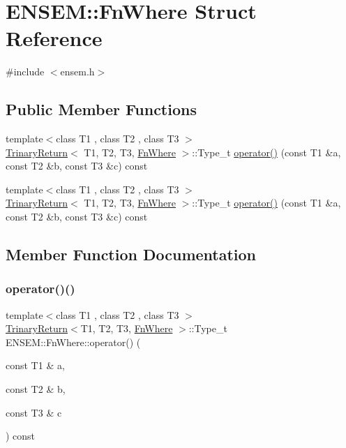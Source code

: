 \hypertarget{structENSEM_1_1FnWhere}{}\section{E\+N\+S\+EM\+:\+:Fn\+Where Struct Reference}
\label{structENSEM_1_1FnWhere}


{\ttfamily \#include $<$ensem.\+h$>$}

\subsection*{Public Member Functions}
\begin{DoxyCompactItemize}
\item 
{\footnotesize template$<$class T1 , class T2 , class T3 $>$ }\\\mbox{\hyperlink{structENSEM_1_1TrinaryReturn}{Trinary\+Return}}$<$ T1, T2, T3, \mbox{\hyperlink{structENSEM_1_1FnWhere}{Fn\+Where}} $>$\+::Type\+\_\+t \mbox{\hyperlink{structENSEM_1_1FnWhere_a8aeb5ef42051b473191ace0a8ae74304}{operator()}} (const T1 \&a, const T2 \&b, const T3 \&c) const
\item 
{\footnotesize template$<$class T1 , class T2 , class T3 $>$ }\\\mbox{\hyperlink{structENSEM_1_1TrinaryReturn}{Trinary\+Return}}$<$ T1, T2, T3, \mbox{\hyperlink{structENSEM_1_1FnWhere}{Fn\+Where}} $>$\+::Type\+\_\+t \mbox{\hyperlink{structENSEM_1_1FnWhere_a8aeb5ef42051b473191ace0a8ae74304}{operator()}} (const T1 \&a, const T2 \&b, const T3 \&c) const
\end{DoxyCompactItemize}


\subsection{Member Function Documentation}
\mbox{\label{structENSEM_1_1FnWhere_a8aeb5ef42051b473191ace0a8ae74304}} 
\subsubsection{\texorpdfstring{operator()()}{operator()()}\hspace{0.1cm}{\footnotesize\ttfamily [1/2]}}
{\footnotesize\ttfamily template$<$class T1 , class T2 , class T3 $>$ \\
\mbox{\hyperlink{structENSEM_1_1TrinaryReturn}{Trinary\+Return}}$<$T1, T2, T3, \mbox{\hyperlink{structENSEM_1_1FnWhere}{Fn\+Where}} $>$\+::Type\+\_\+t E\+N\+S\+E\+M\+::\+Fn\+Where\+::operator() (\begin{DoxyParamCaption}\item[{const T1 \&}]{a,  }\item[{const T2 \&}]{b,  }\item[{const T3 \&}]{c }\end{DoxyParamCaption}) const\hspace{0.3cm}{\ttfamily [inline]}}

